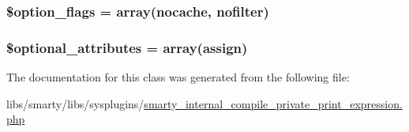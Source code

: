 \subsubsection[{\$option\+\_\+flags}]{\setlength{\rightskip}{0pt plus 5cm}\$option\+\_\+flags = array(\textquotesingle{}nocache\textquotesingle{}, \textquotesingle{}nofilter\textquotesingle{})}\label{class_smarty___internal___compile___private___print___expression_a54756b34496938296f08038f7cf7c46a}
\hypertarget{class_smarty___internal___compile___private___print___expression_a899d1eb4a6fecbd6ce696adb171c80a4}{}
\subsubsection[{\$optional\+\_\+attributes}]{\setlength{\rightskip}{0pt plus 5cm}\$optional\+\_\+attributes = array(\textquotesingle{}assign\textquotesingle{})}\label{class_smarty___internal___compile___private___print___expression_a899d1eb4a6fecbd6ce696adb171c80a4}


The documentation for this class was generated from the following file\+:\begin{DoxyCompactItemize}
\item 
libs/smarty/libs/sysplugins/\hyperlink{smarty__internal__compile__private__print__expression_8php}{smarty\+\_\+internal\+\_\+compile\+\_\+private\+\_\+print\+\_\+expression.\+php}\end{DoxyCompactItemize}
